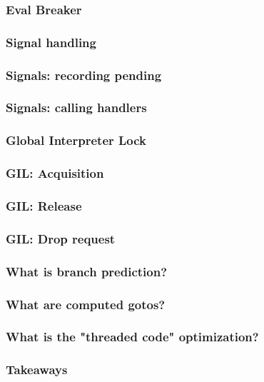 \begin{frame}
\frametitle{Eval Breaker}
\end{frame}

\begin{frame}
\frametitle{Signal handling}
\end{frame}

\begin{frame}
\frametitle{Signals: recording pending}
\end{frame}

\begin{frame}
\frametitle{Signals: calling handlers}
\end{frame}

\begin{frame}
\frametitle{Global Interpreter Lock}
\end{frame}

\begin{frame}
\frametitle{GIL: Acquisition}
\end{frame}

\begin{frame}
\frametitle{GIL: Release}
\end{frame}

\begin{frame}
\frametitle{GIL: Drop request}
\end{frame}

\begin{frame}
\frametitle{What is branch prediction?}
\end{frame}

\begin{frame}
\frametitle{What are computed gotos?}
\end{frame}

\begin{frame}
\frametitle{What is the "threaded code" optimization?}
\end{frame}

\begin{frame}
\frametitle{Takeaways}
\end{frame}


